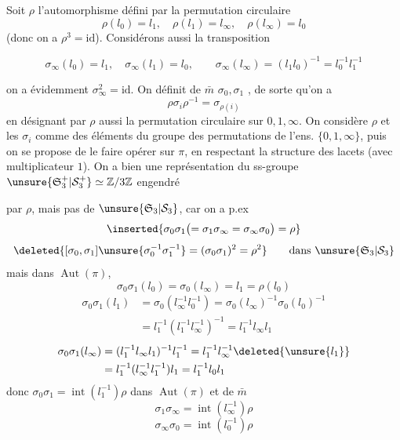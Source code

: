 Soit $\rho$ l'automorphisme défini par la permutation circulaire
\[
\rho(l_0)=l_1,\quad\rho(l_1)=l_\infty,\quad\rho(l_\infty)=l_0
\]
(donc on a $\rho^3=\mathrm{id}$). Considérons aussi la transposition

\[
\sigma_\infty(l_0)=l_1,\quad\sigma_\infty(l_1)=l_0,\qquad
\sigma_\infty(l_\infty)=(l_1l_0)^{-1}=l_0^{-1}l_1^{-1}
\]

on a évidemment $\sigma_\infty^2=\mathrm{id}$. On définit de $\bar m$ $\sigma_0,\sigma_1$ , de sorte qu'on a
\[
\rho\sigma_i\rho^{-1}=\sigma_{\rho(i)}
\]
en désignant par $\rho$ aussi la permutation circulaire sur $0,1,\infty$. On considère $\rho$ et les $\sigma_i$ comme des éléments du groupe  des permutations de l'ens. $\{0,1,\infty\}$, puis on se propose de le faire opérer sur $\pi$, en respectant la structure des lacets (avec  multiplicateur $1$). On a bien une  représentation du ss-groupe $\unsure{\mathfrak S_3^+|\mathcal S_3^+}\simeq\mathbb Z/3\mathbb Z$ engendré

par $\rho$, mais pas de $\unsure{\mathfrak S_3|\mathcal S_3}$, car on a p.ex
\[
\inserted{\sigma_0\sigma_1\bigl(=\sigma_1\sigma_\infty=\sigma_\infty\sigma_0\bigr)=\rho}
\]
\[
\deleted{[\sigma_0,\sigma_1]\unsure{\sigma_0^{-1}\sigma_1^{-1}}=(\sigma_0\sigma_1)^2=\rho^2}\qquad\text{dans }\unsure{\mathfrak S_3|\mathcal S_3}
\]
mais dans $\operatorname{Aut}(\pi)$, 
\[
\sigma_0\sigma_1(l_0)=\sigma_0(l_\infty)=l_1=\rho(l_0)
\]
\[
\begin{aligned}
\sigma_0\sigma_1(l_1)&=\sigma_0(l_\infty^{-1}l_0^{-1})=\sigma_0(l_\infty)^{-1}\sigma_0(l_0)^{-1}\\
&=l_1^{-1}(l_1^{-1}l_\infty^{-1})^{-1}=l_1^{-1}l_\infty l_1
\end{aligned}
\]
\[
\begin{aligned}
\sigma_0\sigma_1(l_\infty)&=(l_1^{-1}l_\infty l_1)^{-1}l_1^{-1}=l_1^{-1}l_\infty^{-1}\deleted{\unsure{l_1}}\\
&=l_1^{-1}(l_\infty^{-1}l_1^{-1})l_1=l_1^{-1}l_0l_1
\end{aligned}
\]
donc $\sigma_0\sigma_1=\operatorname{int}(l_1^{-1})\rho$ dans $\operatorname{Aut}(\pi)$
et de $\bar m$
\[
\sigma_1\sigma_\infty=\operatorname{int}(l_\infty^{-1})\rho
\]
\[
\sigma_\infty\sigma_0=\operatorname{int}(l_0^{-1})\rho
\]

